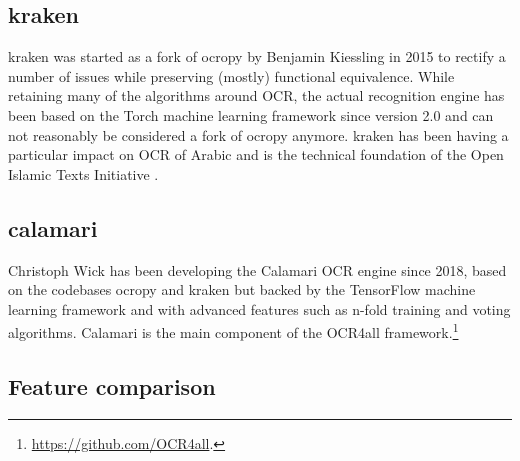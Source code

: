 \documentclass[conference]{IEEEtran}
\begin{document}

\subsection*{kraken}

kraken \cite{DBLP:journals/corr/RomanovMSK17} was started as a fork of ocropy
by Benjamin Kiessling in 2015 to rectify a number of issues while preserving
(mostly) functional equivalence. While retaining many of the algorithms around
OCR, the actual recognition engine has been based on the Torch machine learning
framework since version 2.0 and can not reasonably be considered a fork of
ocropy anymore. kraken has been having a particular impact on OCR
of Arabic and is the technical foundation of the Open Islamic Texts
Initiative \cite{miller_romanov_savant_2018}.


\subsection*{calamari}

Christoph Wick has been developing the Calamari
\cite{DBLP:journals/corr/abs-1807-02004} OCR engine since 2018, based on the
codebases ocropy and kraken but backed by the TensorFlow machine learning
framework and with advanced features such as n-fold training and
voting algorithms. Calamari is the main component of the OCR4all
framework.\footnote{\url{https://github.com/OCR4all}.}

\subsection*{Feature comparison}
\end{document}
